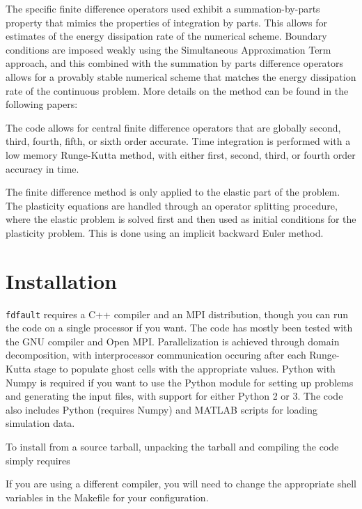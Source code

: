 \documentclass[12pt]{article}   	%
\begin{document}
The specific finite difference operators used exhibit a summation-by-parts property that mimics the properties of integration by parts. This allows for estimates of the energy dissipation rate of the numerical scheme. Boundary conditions are imposed weakly using the Simultaneous Approximation Term approach, and this combined with the summation by parts difference operators allows for a provably stable numerical scheme that matches the energy dissipation rate of the continuous problem. More details on the method can be found in the following papers:

The code allows for central finite difference operators that are globally second, third, fourth, fifth, or sixth order accurate. Time integration is performed with a low memory Runge-Kutta method, with either first, second, third, or fourth order accuracy in time.

The finite difference method is only applied to the elastic part of the problem. The plasticity equations are handled through an operator splitting procedure, where the elastic problem is solved first and then used as initial conditions for the plasticity problem. This is done using an implicit backward Euler method.

\section{Installation}

{\tt fdfault} requires a C++ compiler and an MPI distribution, though you can run the code on a single processor if you want. The code has mostly been tested with the GNU compiler and Open MPI. Parallelization is achieved through domain decomposition, with interprocessor communication occuring after each Runge-Kutta stage to populate ghost cells with the appropriate values. Python with Numpy is required if you want to use the Python module for setting up problems and generating the input files, with support for either Python 2 or 3. The code also includes Python (requires Numpy) and MATLAB scripts for loading simulation data.

To install from a source tarball, unpacking the tarball and compiling the code simply requires

\vspace{0.1in}

\vspace{0.1in}
\noindent If you are using a different compiler, you will need to change the appropriate shell variables in the Makefile for your configuration.
\end{document}
